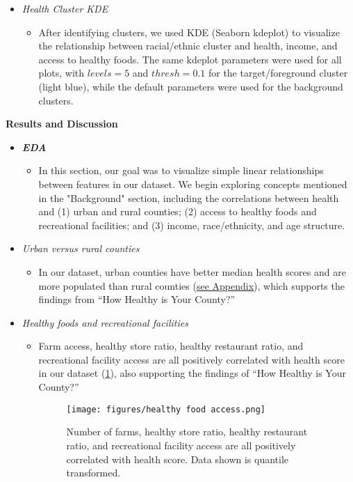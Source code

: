 \documentclass{article}
\begin{document}
\begin{itemize}[leftmargin=0pt]
\begin{itemize}
\item[] \textit{Health Cluster KDE}
\begin{itemize}
    \item[] After identifying clusters, we used KDE (Seaborn kdeplot) to visualize the relationship between racial/ethnic cluster and health, income, and access to healthy foods. The same kdeplot parameters were used for all plots, with $levels=5$ and $thresh=0.1$ for the target/foreground cluster (light blue), while the default parameters were used for the background clusters.
\end{itemize}

\end{itemize}

\textbf{Results and Discussion}
\begin{itemize}
\item[] \textbf{\textit{EDA}}
\begin{itemize}
    \item[] In this section, our goal was to visualize simple linear relationships between features in our dataset. We begin exploring concepts mentioned in the "Background" section, including the correlations between health and (1) urban and rural counties; (2) access to healthy foods and recreational facilities; and (3) income, race/ethnicity, and age structure.
\end{itemize}

\item[] \textit{Urban versus rural counties}
\begin{itemize}
    \item[] In our dataset, urban counties have better median health scores and are more populated than rural counties (\hyperref[fig:urban_rural]{see Appendix}), which supports the findings from “How Healthy is Your County?”\cite{nash2010how} 
\end{itemize}

\item[] \textit{Healthy foods and recreational facilities}
\begin{itemize}
    \item[] Farm access, healthy store ratio, healthy restaurant ratio, and recreational facility access are all positively correlated with health score in our dataset (\ref{fig:health_food}), also supporting the findings of “How Healthy is Your County?”\cite{nash2010how} 
    \begin{figure}[h!]
        \centering
        \texttt{[image: figures/healthy food access.png]}
        \caption{Number of farms, healthy store ratio, healthy restaurant ratio, and recreational facility access are all positively correlated with health score. Data shown is quantile transformed.}
        \label{fig:health_food}
    \end{figure}
\end{itemize}


\end{itemize}
\end{itemize}
\end{document}
